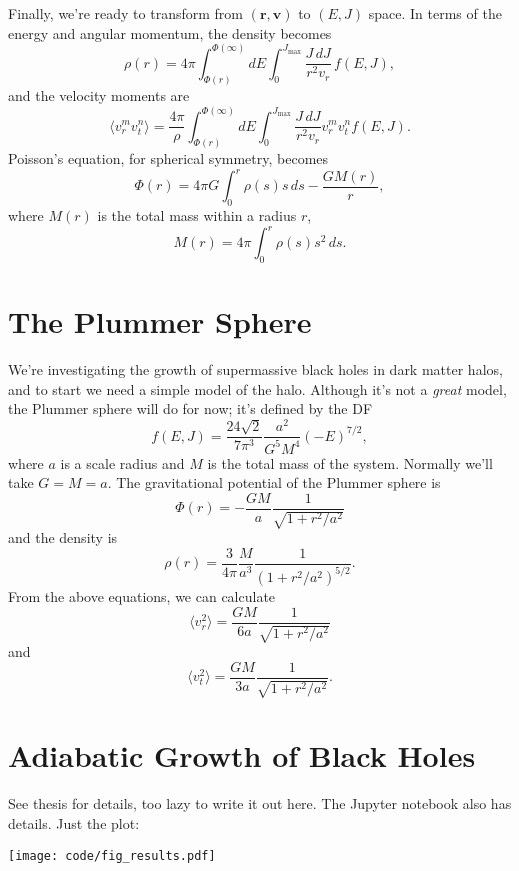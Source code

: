 \documentclass[10pt]{article}
\begin{document}
Finally, we're ready to transform from $(\textbf{r}, \textbf{v})$ to $(E, J)$ space.  In terms of the energy and angular momentum, the density becomes
\begin{equation}
\rho(r) = 4 \pi \int_{\Phi(r)}^{\Phi(\infty)} dE \int_0^{J_\text{max}} \frac{J\, dJ}{r^2 v_r} \, f(E, J),
\end{equation}
and the velocity moments are
\begin{equation}
\langle v_r^m v_t^n \rangle = \frac{4 \pi}{\rho} \int_{\Phi(r)}^{\Phi(\infty)} dE \int_0^{J_\text{max}} \frac{J\, dJ}{r^2 v_r} v_r^m v_t^n f(E, J).
\end{equation}
Poisson's equation, for spherical symmetry, becomes
\begin{equation}
\Phi(r) = 4 \pi G \int_0^r \rho(s) s \, ds - \frac{GM(r)}{r},
\end{equation}
where $M(r)$ is the total mass within a radius $r$,
\begin{equation}
M(r) = 4 \pi \int_0^r \rho(s) s^2 \, ds.
\end{equation}

\section{The Plummer Sphere}

We're investigating the growth of supermassive black holes in dark matter halos, and to start we need a simple model of the halo.  Although it's not a \emph{great} model, the Plummer sphere will do for now; it's defined by the DF
\begin{equation}
f(E, J) = \frac{24 \sqrt{2}}{7 \pi^3} \frac{a^2}{G^5 M^4} (-E)^{7/2},
\end{equation}
where $a$ is a scale radius and $M$ is the total mass of the system.  Normally we'll take $G = M = a$.  The gravitational potential of the Plummer sphere is
\begin{equation}
\Phi(r) = - \frac{GM}{a} \frac{1}{\sqrt{1 + r^2/a^2}}
\end{equation}
and the density is
\begin{equation}
\rho(r) = \frac{3}{4\pi} \frac{M}{a^3} \frac{1}{(1 + r^2/a^2)^{5/2}}.
\end{equation}
From the above equations, we can calculate 
\begin{equation}
\langle v_r^2 \rangle = \frac{GM}{6a} \frac{1}{\sqrt{1 + r^2/a^2}}
\end{equation}
and 
\begin{equation}
\langle v_t^2 \rangle = \frac{GM}{3a} \frac{1}{\sqrt{1 + r^2/a^2}}.
\end{equation}



\section{Adiabatic Growth of Black Holes}

See thesis for details, too lazy to write it out here.  The Jupyter notebook also has details.  Just the plot:

\texttt{[image: code/fig\_results.pdf]}
\end{document}
